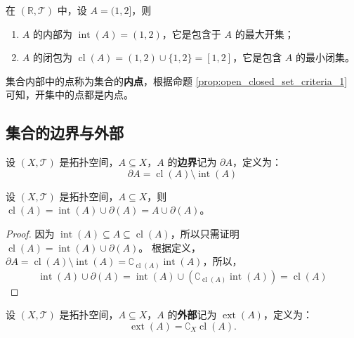 \begin{example}
    在 $(\mathbb{R},\mathcal{T})$ 中，设 $A=(1,2]$，则
    \begin{enumerate}
        \item $A$ 的内部为 $\operatorname{int}(A)=(1,2)$，它是包含于 $A$ 的最大开集；
        \item $A$ 的闭包为 $\operatorname{cl}(A)=(1,2) \cup \{1,2\} = [1,2]$，它是包含 $A$ 的最小闭集。
    \end{enumerate}
\end{example}

\begin{note}
    集合内部中的点称为集合的\textbf{内点}，根据命题 \ref{prop:open_closed_set_criteria_1} 可知，开集中的点都是内点。
\end{note}

\vspace{1em}

\subsection{集合的边界与外部}
\begin{definition}
    设 $(X,\mathcal{T})$ 是拓扑空间，$A\subseteq X$，$A$ 的\textbf{边界}记为 $\partial A$，定义为：
    \[
        \partial A = \operatorname{cl}(A) \setminus \operatorname{int}(A)
    \]
    \label{def:set_boundary}
\end{definition}

\begin{proposition}[闭包分解]
    设 $(X,\mathcal{T})$ 是拓扑空间，$A\subseteq X$，则 $\operatorname{cl}(A) = \operatorname{int}(A) \cup \partial(A) = A \cup \partial(A) $。
    \label{prop:closure_decomposition}
\end{proposition}
\begin{proof}
    因为 $\operatorname{int}(A)\subseteq A \subseteq \operatorname{cl}(A)$，所以只需证明 $\operatorname{cl}(A) = \operatorname{int}(A) \cup \partial(A)$。
    根据定义，$\partial A = \operatorname{cl}(A) \setminus \operatorname{int}(A) = \complement_{\operatorname{cl}(A)} \operatorname{int}(A)$，所以，
    \[
        \operatorname{int}(A) \cup \partial(A) = \operatorname{int}(A) \cup (\complement_{\operatorname{cl}(A)} \operatorname{int}(A)) = \operatorname{cl}(A)
    \]
\end{proof}
\vspace{1em}

\begin{definition}
    设 $(X,\mathcal{T})$ 是拓扑空间，$A\subseteq X$，$A$ 的\textbf{外部}记为 $\operatorname{ext}(A)$，定义为：
    \[
        \operatorname{ext}(A) = \complement_X \operatorname{cl}(A).
    \]
    \label{def:set_exterior}
\end{definition}

